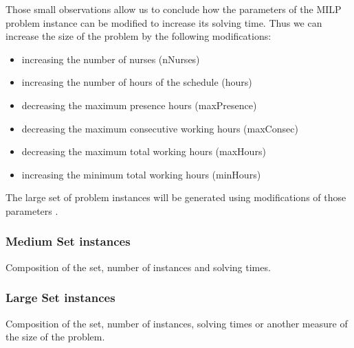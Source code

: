 Those small observations allow us to conclude how the parameters of the MILP problem instance can be modified to increase its solving time. Thus we can increase the size of the problem by the following modifications:\\
\begin{itemize}
	\item increasing the number of nurses (nNurses)
	\item increasing the number of hours of the schedule (hours)
	\item decreasing the maximum presence hours (maxPresence)
	\item decreasing the maximum consecutive working hours (maxConsec)
	\item decreasing the maximum total working hours (maxHours)
	\item increasing the minimum total working hours (minHours)
\end{itemize}
The large set of problem instances will be generated using modifications of those parameters .


\subsubsection{Medium Set instances}

Composition of the set, number of instances and solving times.

\subsubsection{Large Set instances}

Composition of the set, number of instances, solving times or another measure of the size of the problem.


\pagebreak